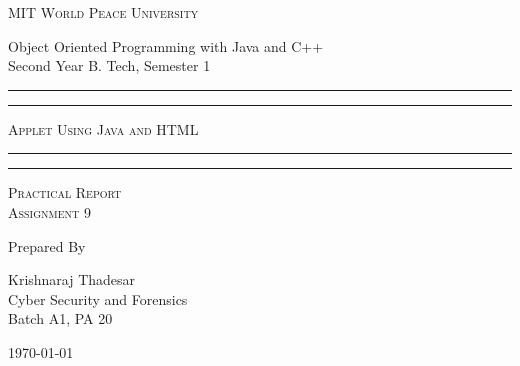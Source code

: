 \documentclass[11pt]{article}
\begin{document}
\begin{titlepage}
	\centering


	\huge\textsc{
		MIT World Peace University
	}\\

	\vspace{0.75\baselineskip} %

	\LARGE{
		Object Oriented Programming with Java and C++\\
		Second Year B. Tech, Semester 1
	}

	\vfill %


	\rule{\textwidth}{1.6pt}\vspace*{-\baselineskip}\vspace*{2pt}
	\rule{\textwidth}{0.6pt}
	\vspace{0.75\baselineskip} %



	\huge{\textsc{
			Applet Using Java and HTML
		}} \\



	\vspace{0.5\baselineskip} %
	\rule{\textwidth}{0.6pt}\vspace*{-\baselineskip}\vspace*{2.8pt}
	\rule{\textwidth}{1.6pt}

	\vspace{1\baselineskip} %


	\LARGE\textsc{
		Practical Report\\
		Assignment 9
	} %
	\vfill


	Prepared By
	\vspace{0.5\baselineskip} %

	\Large{
		Krishnaraj Thadesar \\
		Cyber Security and Forensics\\
		Batch A1, PA 20
	}


	\vspace{0.5\baselineskip} %
	\today

\end{titlepage}
\end{document}
